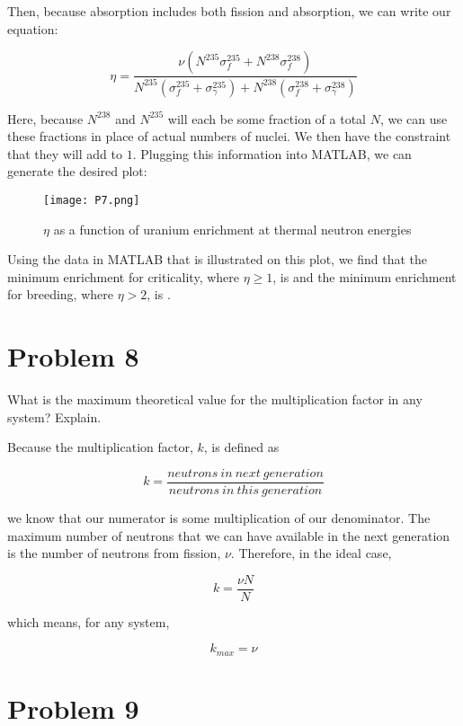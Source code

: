 \documentclass{article}
\begin{document}
Then, because absorption includes both fission and absorption, we can write our equation:

$$\eta = \frac{\nu (N^{235}\sigma_{f}^{235} + N^{238}\sigma_{f}^{238})}{N^{235}(\sigma_{f}^{235} + \sigma_{\gamma}^{235}) + N^{238}(\sigma_{f}^{238} + \sigma_{\gamma}^{238})}$$

Here, because $N^{238}$ and $N^{235}$ will each be some fraction of a total $N$, we can use these fractions in place of actual numbers of nuclei. We then have the constraint that they will add to $1$. Plugging this information into MATLAB, we can generate the desired plot:

\begin{figure}[h]
    \centering
    \texttt{[image: P7.png]}
    \caption{$\eta$ as a function of uranium enrichment at thermal neutron energies}
\end{figure}

Using the data in MATLAB that is illustrated on this plot, we find that the minimum enrichment for criticality, where $\eta \geq 1$, is  and the minimum enrichment for breeding, where $\eta > 2$, is .

\hrulefill

\section*{Problem 8}

What is the maximum theoretical value for the multiplication factor in any system? Explain.

\hrulefill

Because the multiplication factor, $k$, is defined as

$$k = \frac{neutrons~in~next~generation}{neutrons~in~this~generation}$$

we know that our numerator is some multiplication of our denominator. The maximum number of neutrons that we can have available in the next generation is the number of neutrons from fission, $\nu$. Therefore, in the ideal case,

$$k = \frac{\nu N}{N}$$

which means, for any system,

$$\boxed{k_{max} = \nu}$$

\hrulefill

\section*{Problem 9}
\end{document}
